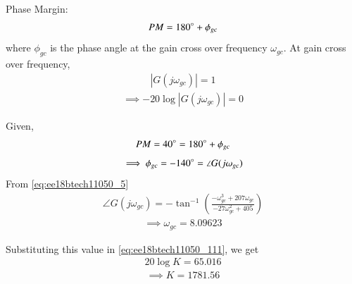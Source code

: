 \begin{enumerate}[label=\thesection.\arabic*.,ref=\thesection.\theenumi]
Phase Margin:
\begin{align}
    PM = 180\degree + \phi_{gc}
    \label{eq:ee18btech11050_7}
\end{align}
where $\phi_{gc}$ is the phase angle at the gain cross over frequency $\omega_{gc}$.
At gain cross over frequency,
\begin{align}
    |G(j\omega_{gc})| = 1
\end{align}
\begin{align}
    \implies -20\log{|G(j\omega_{gc})|} = 0
    \label{eq:ee18btech11050_111}
\end{align}

Given,
\begin{align}
    PM = 40\degree = 180\degree + \phi_{gc}
    \label{eq:ee18btech11050_8}
\end{align}
\begin{align}
    \implies \phi_{gc} = -140\degree = \angle{G(j\omega_{gc})}
\end{align}
From \eqref{eq:ee18btech11050_5} 
\begin{align}
    \angle{G(j\omega_{gc})} = -\tan^{-1}(\frac{-\omega_{gc}^3+207\omega_{gc}}{-27\omega_{gc}^2+405})
    \label{eq:ee18btech11050_9}
\end{align}
\begin{align}
    \implies \omega_{gc} = 8.09623
    \label{eq:ee18btech11050_10}
\end{align}

Substituting this value in \eqref{eq:ee18btech11050_111}, we get
\begin{align}
    20\log{K} = 65.016
\end{align}
\begin{align}
    \implies K = 1781.56
    \label{eq:ee18btech11050_12}
\end{align}


\end{enumerate}
